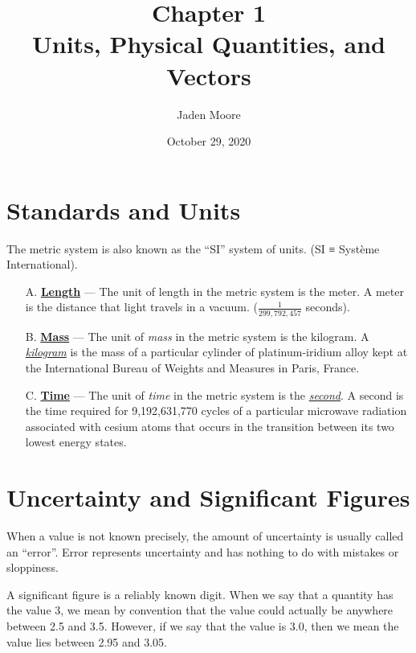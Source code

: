 \documentclass[12pt]{article}
\title{
    Chapter 1 \\
    Units, Physical Quantities, and Vectors
    }
\author{Jaden Moore}
\date{October 29, 2020}
\begin{document}

\maketitle

\pagestyle{fancy}
\fancyhf{}
\setlength{\headheight}{15pt}
\cfoot{\thepage}

\section{Standards and Units}
The metric system is also known as the “SI” system
of units. (SI ≡ Système International).

\begin{itemize}
    \item[A.] \textbf{\underline{Length}} — The unit of length in the metric system is the meter.
          A meter is the distance that light travels in a vacuum.
          ($\frac{1}{299,792,457}$ seconds).

    \item[B.] \textbf{\underline{Mass}} — The unit of \textit{mass} in the metric system is the kilogram.
          A \textit{\underline{kilogram}} is the mass of a particular cylinder of
          platinum-iridium alloy kept at the International Bureau of
          Weights and Measures in Paris, France.
 
    \item[C.] \textbf{\underline{Time}} — The unit of \textit{time} in the metric system is the \textit{\underline{second}}. A
          second is the time required for 9,192,631,770 cycles of a particular microwave radiation associated with cesium
          atoms that occurs in the transition between its two lowest
          energy states.
\end{itemize}

\section{Uncertainty and Significant Figures}
When a value is not known precisely, the amount of
uncertainty is usually called an “error”. Error represents
uncertainty and has nothing to do with mistakes or
sloppiness.

A significant figure is a reliably known digit. When we
say that a quantity has the value 3, we mean by
convention that the value could actually be anywhere
between 2.5 and 3.5. However, if we say that the value is
3.0, then we mean the value lies between 2.95 and 3.05.
\end{document}
